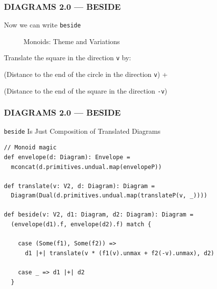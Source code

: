 \documentclass{beamer}
\begin{document}
\begin{frame} \frametitle{DIAGRAMS 2.0 --- BESIDE}
Now we can write \texttt{beside}
  \begin{figure}
      \centering
      \caption{Monoids: Theme and Variations}
  \end{figure}
  \vspace{-.5cm}
  Translate the square in the direction \texttt{v} by:

  (Distance to the end of the circle in the direction \texttt{v}) +

  (Distance to the end of the square in the direction \texttt{-v})
\end{frame}

\begin{frame}[fragile] \frametitle{DIAGRAMS 2.0 --- BESIDE}
  \begin{block}{\texttt{beside} Is Just Composition of Translated Diagrams}
  \begin{lstlisting}
// Monoid magic
def envelope(d: Diagram): Envelope =
  mconcat(d.primitives.undual.map(envelopeP))

def translate(v: V2, d: Diagram): Diagram =
  Diagram(Dual(d.primitives.undual.map(translateP(v, _))))

def beside(v: V2, d1: Diagram, d2: Diagram): Diagram =
  (envelope(d1).f, envelope(d2).f) match {

    case (Some(f1), Some(f2)) =>
      d1 |+| translate(v * (f1(v).unmax + f2(-v).unmax), d2)

    case _ => d1 |+| d2
  }
  \end{lstlisting}
  \vspace{-0.4cm}
  \end{block}
\end{frame}
\end{document}
